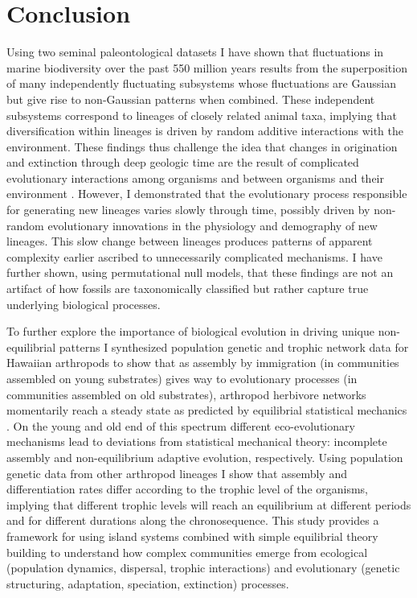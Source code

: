\chapter*{Conclusion}

Using two seminal paleontological datasets \citep{sepkoski1992,
  alroy08} I have shown that fluctuations in marine biodiversity over
the past 550 million years results from the superposition of many
independently fluctuating subsystems whose fluctuations are Gaussian
but give rise to non-Gaussian patterns when combined.  These
independent subsystems correspond to lineages of closely related
animal taxa, implying that diversification within lineages is driven
by random additive interactions with the environment. These findings
thus challenge the idea that changes in origination and extinction
through deep geologic time are the result of complicated evolutionary
interactions among organisms and between organisms and their
environment \citep{bak1993, sole1997, newman1995}. However, I
demonstrated that the evolutionary process responsible for generating
new lineages varies slowly through time, possibly driven by non-random
evolutionary innovations in the physiology and demography of new
lineages. This slow change between lineages produces patterns of
apparent complexity earlier ascribed to unnecessarily complicated
mechanisms. I have further shown, using permutational null models,
that these findings are not an artifact of how fossils are
taxonomically classified but rather capture true underlying biological
processes.

To further explore the importance of biological evolution in driving
unique non-equilibrial patterns I synthesized population genetic and
trophic network data for Hawaiian arthropods to show that as assembly
by immigration (in communities assembled on young substrates) gives
way to evolutionary processes (in communities assembled on old
substrates), arthropod herbivore networks momentarily reach a steady
state as predicted by equilibrial statistical mechanics
\citep{rominger2015GEB}. On the young and old end of this spectrum
different eco-evolutionary mechanisms lead to deviations from
statistical mechanical theory: incomplete assembly and non-equilibrium
adaptive evolution, respectively. Using population genetic data from
other arthropod lineages I show that assembly and differentiation
rates differ according to the trophic level of the organisms, implying
that different trophic levels will reach an equilibrium at different
periods and for different durations along the chronosequence.  This
study provides a framework for using island systems combined with
simple equilibrial theory building to understand how complex
communities emerge from ecological (population dynamics, dispersal,
trophic interactions) and evolutionary (genetic structuring,
adaptation, speciation, extinction) processes.

